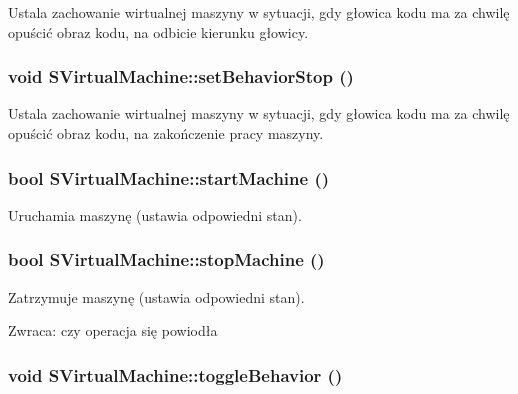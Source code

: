 Ustala zachowanie wirtualnej maszyny w sytuacji, gdy głowica kodu ma za chwilę opuścić obraz kodu, na odbicie kierunku głowicy. \hypertarget{classSVirtualMachine_6d7c9f2fe223810123062d1c74ae542a}{
\subsubsection[{setBehaviorStop}]{\setlength{\rightskip}{0pt plus 5cm}void SVirtualMachine::setBehaviorStop ()}}
\label{classSVirtualMachine_6d7c9f2fe223810123062d1c74ae542a}


Ustala zachowanie wirtualnej maszyny w sytuacji, gdy głowica kodu ma za chwilę opuścić obraz kodu, na zakończenie pracy maszyny. \hypertarget{classSVirtualMachine_49e93dd25b48a8dbba896f9b2964c526}{
\subsubsection[{startMachine}]{\setlength{\rightskip}{0pt plus 5cm}bool SVirtualMachine::startMachine ()}}
\label{classSVirtualMachine_49e93dd25b48a8dbba896f9b2964c526}


Uruchamia maszynę (ustawia odpowiedni stan). \hypertarget{classSVirtualMachine_81211b6ef712dbc4a147d7fa86aed440}{
\subsubsection[{stopMachine}]{\setlength{\rightskip}{0pt plus 5cm}bool SVirtualMachine::stopMachine ()}}
\label{classSVirtualMachine_81211b6ef712dbc4a147d7fa86aed440}


Zatrzymuje maszynę (ustawia odpowiedni stan). \begin{Desc}
\item[Zwraca:]czy operacja się powiodła \end{Desc}
\hypertarget{classSVirtualMachine_1d68dbb4416964707c818a550dcb10e9}{
\subsubsection[{toggleBehavior}]{\setlength{\rightskip}{0pt plus 5cm}void SVirtualMachine::toggleBehavior ()}}
\label{classSVirtualMachine_1d68dbb4416964707c818a550dcb10e9}


